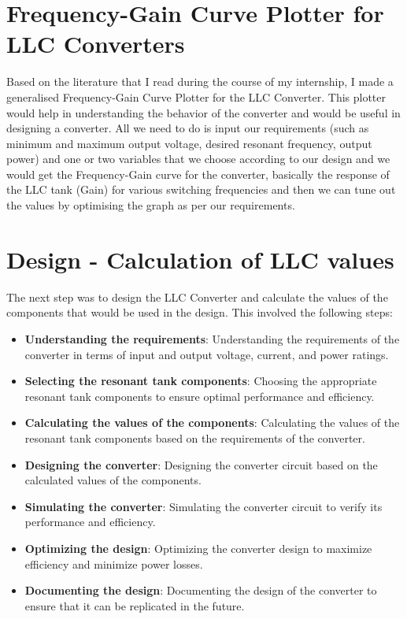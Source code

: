 \section{Frequency-Gain Curve Plotter for LLC Converters}
Based on the literature that I read during the course of my internship, I made a generalised Frequency-Gain Curve Plotter for the LLC Converter. This plotter would help in understanding the behavior of the converter and would be useful in designing a converter.
\noindent
All we need to do is input our requirements (such as minimum and maximum output voltage, desired resonant frequency, output power) and one or two variables that we choose according to our design and we would get the Frequency-Gain curve for the converter, basically the response of the LLC tank (Gain) for various switching frequencies and then we can tune out the values by optimising the graph as per our requirements.

\section{Design - Calculation of LLC values}
The next step was to design the LLC Converter and calculate the values of the components that would be used in the design. This involved the following steps:

\begin{itemize}
    \item \textbf{Understanding the requirements}: Understanding the requirements of the converter in terms of input and output voltage, current, and power ratings.
    \item \textbf{Selecting the resonant tank components}: Choosing the appropriate resonant tank components to ensure optimal performance and efficiency.
    \item \textbf{Calculating the values of the components}: Calculating the values of the resonant tank components based on the requirements of the converter.
    \item \textbf{Designing the converter}: Designing the converter circuit based on the calculated values of the components.
    \item \textbf{Simulating the converter}: Simulating the converter circuit to verify its performance and efficiency.
    \item \textbf{Optimizing the design}: Optimizing the converter design to maximize efficiency and minimize power losses.
    \item \textbf{Documenting the design}: Documenting the design of the converter to ensure that it can be replicated in the future.
\end{itemize}

